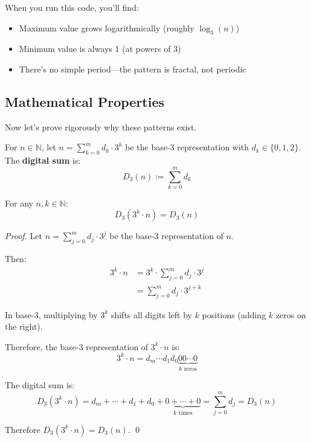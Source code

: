 \begin{example}
When you run this code, you'll find:
\begin{itemize}
\item Maximum value grows logarithmically (roughly $\log_3(n)$)
\item Minimum value is always 1 (at powers of 3)
\item There's no simple period—the pattern is fractal, not periodic
\end{itemize}
\end{example}


\subsection{Mathematical Properties}
\label{subsec:mathematical-properties}

Now let's prove rigorously why these patterns exist.

\begin{definition}
For $n \in \mathbb{N}$, let $n = \sum_{k=0}^{m} d_k \cdot 3^k$ be the base-3 representation with $d_k \in \{0,1,2\}$. The \textbf{digital sum} is:
$$D_3(n) := \sum_{k=0}^{m} d_k$$
\end{definition}

\begin{theorem}
\label{thm:d3-self-similarity}
For any $n, k \in \mathbb{N}$:
$$D_3(3^k \cdot n) = D_3(n)$$
\end{theorem}

\begin{proof}
Let $n = \sum_{j=0}^{m} d_j \cdot 3^j$ be the base-3 representation of $n$.

Then:
\begin{align}
3^k \cdot n &= 3^k \cdot \sum_{j=0}^{m} d_j \cdot 3^j \\
&= \sum_{j=0}^{m} d_j \cdot 3^{j+k}
\end{align}

In base-3, multiplying by $3^k$ shifts all digits left by $k$ positions (adding $k$ zeros on the right).

Therefore, the base-3 representation of $3^k \cdot n$ is:
$$3^k \cdot n = d_m \cdots d_1 d_0 \underbrace{00\cdots0}_{k \text{ zeros}}$$

The digital sum is:
$$D_3(3^k \cdot n) = d_m + \cdots + d_1 + d_0 + \underbrace{0 + \cdots + 0}_{k \text{ times}} = \sum_{j=0}^{m} d_j = D_3(n)$$

Therefore $D_3(3^k \cdot n) = D_3(n)$. \qed
\end{proof}

